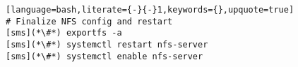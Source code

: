 \begin{lstlisting}[language=bash,literate={-}{-}1,keywords={},upquote=true]
# Finalize NFS config and restart
[sms](*\#*) exportfs -a
[sms](*\#*) systemctl restart nfs-server
[sms](*\#*) systemctl enable nfs-server
\end{lstlisting}

